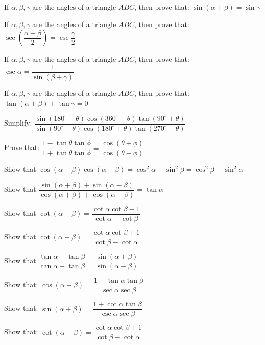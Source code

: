 \documentclass[11pt,a4paper]{article}
\begin{document}
\begin{longlist}
\item If $\alpha,\beta,\gamma$ are the angles of a triangle $ABC$, then prove that: $\sin(\alpha+\beta)=\sin\gamma$

\item If $\alpha,\beta,\gamma$ are the angles of a triangle $ABC$, then prove that: $\sec\left(\dfrac{\alpha+\beta}{2}\right)=\csc\dfrac{\gamma}{2}$

\item If $\alpha,\beta,\gamma$ are the angles of a triangle $ABC$, then prove that: $\csc\alpha=\dfrac{1}{\sin(\beta+\gamma)}$

\item If $\alpha,\beta,\gamma$ are the angles of a triangle $ABC$, then prove that: $\tan(\alpha+\beta)+\tan\gamma=0$

\item Simplify: $\dfrac{\sin(180^\circ-\theta)\cos(360^\circ-\theta)\tan(90^\circ+\theta)}{\sin(90^\circ-\theta)\cos(180^\circ+\theta)\tan(270^\circ-\theta)}$

\item Prove that: $\dfrac{1-\tan\theta\tan\phi}{1+\tan\theta\tan\phi}=\dfrac{\cos(\theta+\phi)}{\cos(\theta-\phi)}$

\item Show that $\cos(\alpha+\beta)\cos(\alpha-\beta)=\cos^2\alpha-\sin^2\beta=\cos^2\beta-\sin^2\alpha$

\item Show that $\dfrac{\sin(\alpha+\beta)+\sin(\alpha-\beta)}{\cos(\alpha+\beta)+\cos(\alpha-\beta)}=\tan\alpha$

\item Show that $\cot(\alpha+\beta)=\dfrac{\cot\alpha\cot\beta-1}{\cot\alpha+\cot\beta}$

\item Show that $\cot(\alpha-\beta)=\dfrac{\cot\alpha\cot\beta+1}{\cot\beta-\cot\alpha}$

\item Show that $\dfrac{\tan\alpha+\tan\beta}{\tan\alpha-\tan\beta}=\dfrac{\sin(\alpha+\beta)}{\sin(\alpha-\beta)}$

\item Show that: $\cos(\alpha-\beta)=\dfrac{1+\tan\alpha\tan\beta}{\sec\alpha\sec\beta}$

\item Show that: $\sin(\alpha+\beta)=\dfrac{1+\cot\alpha\tan\beta}{\csc\alpha\sec\beta}$

\item Show that: $\cot(\alpha-\beta)=\dfrac{\cot\alpha\cot\beta+1}{\cot\beta-\cot\alpha}$


\end{longlist}
\end{document}
